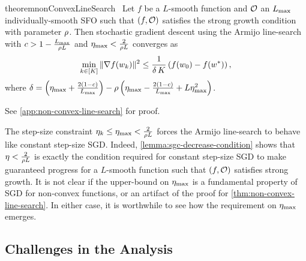\begin{restatable}{theorem}{nonConvexLineSearch}~\label{thm:non-convex-line-search}
    Let \( f \) be a \( L \)-smooth function and \( \oracle{} \) an \( \Lmax \) individually-smooth \ac{SFO} such that \( \rbr{f, \oracle{}} \) satisfies the strong growth condition with parameter \( \sgc \).
    Then stochastic gradient descent using the Armijo line-search with \( c >  1 - \frac{\Lmax}{\sgc L}\) and \( \etamax <  \frac{2}{\sgc L} \) converges as
    \[ \min_{k \in [K]} \norm{\grad(\wk)}^2 \leq \frac{1}{\delta \, K} \rbr{f(w_0) - f(\wopt)}, \]
    where \( \delta = \rbr{\etamax + \frac{2(1-c)}{\Lmax}} - \sgc \rbr{\etamax - \frac{2(1-c)}{\Lmax} + L \etamax^2} \).
\end{restatable}
\noindent See \autoref{app:non-convex-line-search} for proof. \hfill \break 

The step-size constraint \( \etak \leq \etamax < \frac{2}{\sgc L} \) forces the Armijo line-search to behave like constant step-size \ac{SGD}.
Indeed, \autoref{lemma:sgc-decrease-condition} shows that \( \eta < \frac{2}{\sgc L} \) is exactly the condition required for constant step-size \ac{SGD} to make guaranteed progress for a \( L \)-smooth function such that \( \rbr{f, \oracle{}} \) satisfies strong growth.
It is not clear if the upper-bound on \( \etamax \) is a fundamental property of \ac{SGD} for non-convex functions, or an artifact of the proof for \autoref{thm:non-convex-line-search}. 
In either case, it is worthwhile to see how the requirement on \( \etamax \) emerges.

\subsection{Challenges in the Analysis}\label{sec:ls-nc-challenges}

